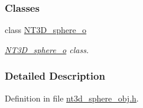 \subsubsection*{Classes}
\begin{DoxyCompactItemize}
\item 
class \hyperlink{class_n_t3_d__sphere__o}{NT3D\_\-sphere\_\-o}
\begin{DoxyCompactList}\small\item\em \hyperlink{class_n_t3_d__sphere__o}{NT3D\_\-sphere\_\-o} class. \item\end{DoxyCompactList}\end{DoxyCompactItemize}


\subsubsection{Detailed Description}


Definition in file \hyperlink{nt3d__sphere__obj_8h_source}{nt3d\_\-sphere\_\-obj.h}.

